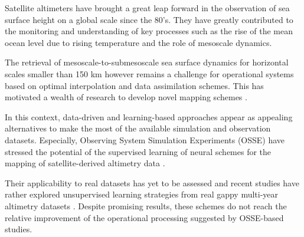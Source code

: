 \begin{bibunit}[IEEEtran.bst]







  Satellite altimeters have brought a great leap forward in the observation of sea surface height on a global scale since the 80's. They have greatly contributed to the monitoring and understanding of key processes such as the rise of the mean ocean level due to rising temperature and the role of mesoscale dynamics.
  
  The retrieval of mesoscale-to-submesoscale sea surface dynamics for horizontal scales smaller than 150 km however remains a challenge for operational systems based on optimal interpolation \cite{taburetDUACSDT2018252019} and data assimilation \cite{jean-michelCopernicusGlobal122021} schemes. This has motivated a wealth of research to develop novel mapping schemes \cite{ballarottaDynamicMappingAlongTrack2020,ubelmannReconstructingOceanSurface2021,guillouMappingAltimetryForthcoming2021}.

  In this context, data-driven and learning-based approaches \cite{alveraazcarateReconstructionIncompleteOceanographic2005,barthDINCAEMultivariateConvolutional2022,lguensatAnalogDataAssimilation2017,fabletENDTOENDPHYSICSINFORMEDREPRESENTATION2021,martinSynthesizingSeaSurface2023} appear as appealing alternatives to make the most of the available simulation and observation datasets. Especially, Observing System Simulation Experiments (OSSE) have stressed the potential of the supervised learning of neural schemes for the mapping of satellite-derived altimetry data \cite{fabletENDTOENDPHYSICSINFORMEDREPRESENTATION2021,beauchamp4DVarNetSSHEndtoendLearning2023}. 
  
  Their applicability to real datasets has yet to be assessed and recent studies have rather explored unsupervised learning strategies from real gappy multi-year altimetry datasets \cite{martinSynthesizingSeaSurface2023}. Despite promising results, these schemes do not reach the relative improvement of the operational processing suggested by OSSE-based studies.
  

\end{bibunit}
